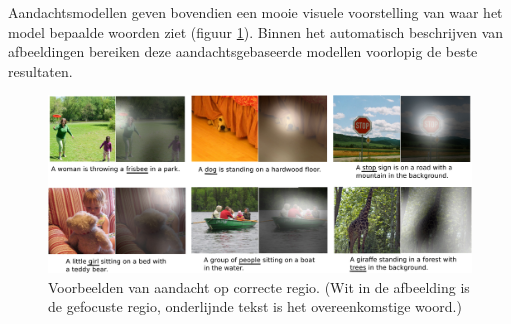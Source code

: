 Aandachtsmodellen geven bovendien een mooie visuele voorstelling van waar het model bepaalde woorden ziet (figuur \ref{fig:attention-example}). Binnen het automatisch beschrijven van afbeeldingen bereiken deze aandachtsgebaseerde modellen voorlopig de beste resultaten\cite{Xu2015,Jin2015}.

\begin{figure}[tb]
	\centering
	\includegraphics[width=\linewidth]{Images/good_Xu.pdf}
	\caption[Voorbeelden van aandacht op correcte regio.]{Voorbeelden van aandacht op correcte regio. (Wit in de afbeelding is de gefocuste regio, onderlijnde tekst is het overeenkomstige woord.)\cite{Xu2015}}
	\label{fig:attention-example}
\end{figure}

